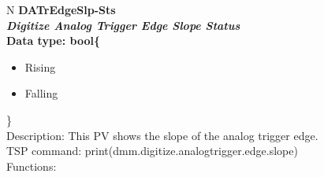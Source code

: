\documentclass[openany]{article}
\begin{document}
		\begin{tabular}{N}
			\hline
			\bfseries DATrEdgeSlp-Sts\label{pv:datredgeslp-sts} \\ \hline
			\emph{Digitize Analog Trigger Edge Slope Status} \\
			Data type: bool\{\begin{itemize}[noitemsep]
				\small
				\item[] Rising
				\item[] Falling
			\end{itemize}\} \\
			Description: This PV shows the slope of the analog trigger edge. \\
			TSP command: print(dmm.digitize.analogtrigger.edge.slope) \\
			Functions: \\
			\arrayrulecolor{\FuncTableBorderColor}

		\end{tabular}
\end{document}

